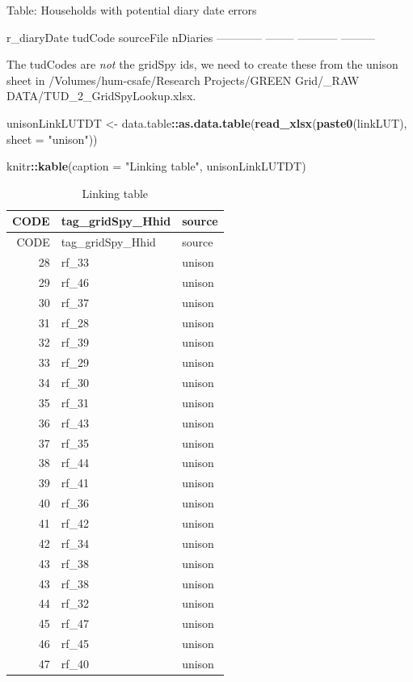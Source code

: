 \documentclass[]{article}
\newenvironment{Shaded}{\begin{snugshade}}{\end{snugshade}}
\newcommand{\KeywordTok}[1]{\textcolor[rgb]{0.13,0.29,0.53}{\textbf{#1}}}
\newcommand{\DataTypeTok}[1]{\textcolor[rgb]{0.13,0.29,0.53}{#1}}
\newcommand{\StringTok}[1]{\textcolor[rgb]{0.31,0.60,0.02}{#1}}
\newcommand{\OperatorTok}[1]{\textcolor[rgb]{0.81,0.36,0.00}{\textbf{#1}}}
\newcommand{\NormalTok}[1]{#1}
\begin{document}
Table: Households with potential diary date errors

r\_diaryDate tudCode sourceFile nDiaries ------------ --------
----------- ---------

The tudCodes are \emph{not} the gridSpy ids, we need to create these
from the unison sheet in /Volumes/hum-csafe/Research Projects/GREEN
Grid/\_RAW DATA/TUD\_2\_GridSpyLookup.xlsx.

\begin{Shaded}
\begin{Highlighting}[]
\NormalTok{unisonLinkLUTDT <-}\StringTok{ }\NormalTok{data.table}\OperatorTok{::}\KeywordTok{as.data.table}\NormalTok{(}\KeywordTok{read_xlsx}\NormalTok{(}\KeywordTok{paste0}\NormalTok{(linkLUT), }\DataTypeTok{sheet =} \StringTok{"unison"}\NormalTok{))}

\NormalTok{knitr}\OperatorTok{::}\KeywordTok{kable}\NormalTok{(}\DataTypeTok{caption =} \StringTok{"Linking table"}\NormalTok{, unisonLinkLUTDT)}
\end{Highlighting}
\end{Shaded}

\begin{longtable}[]{@{}rll@{}}
\caption{Linking table}\tabularnewline
\toprule
CODE & tag\_gridSpy\_Hhid & source\tabularnewline
\midrule
\endfirsthead
\toprule
CODE & tag\_gridSpy\_Hhid & source\tabularnewline
\midrule
\endhead
28 & rf\_33 & unison\tabularnewline
29 & rf\_46 & unison\tabularnewline
30 & rf\_37 & unison\tabularnewline
31 & rf\_28 & unison\tabularnewline
32 & rf\_39 & unison\tabularnewline
33 & rf\_29 & unison\tabularnewline
34 & rf\_30 & unison\tabularnewline
35 & rf\_31 & unison\tabularnewline
36 & rf\_43 & unison\tabularnewline
37 & rf\_35 & unison\tabularnewline
38 & rf\_44 & unison\tabularnewline
39 & rf\_41 & unison\tabularnewline
40 & rf\_36 & unison\tabularnewline
41 & rf\_42 & unison\tabularnewline
42 & rf\_34 & unison\tabularnewline
43 & rf\_38 & unison\tabularnewline
43 & rf\_38 & unison\tabularnewline
44 & rf\_32 & unison\tabularnewline
45 & rf\_47 & unison\tabularnewline
46 & rf\_45 & unison\tabularnewline
47 & rf\_40 & unison\tabularnewline
\bottomrule
\end{longtable}
\end{document}
